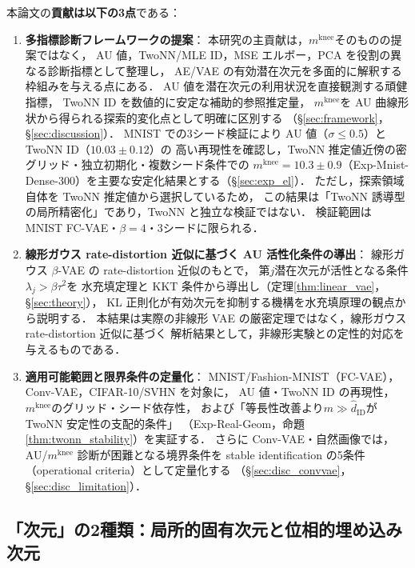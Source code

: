 \documentclass[11pt,a4paper]{jsarticle}
\newcommand{\mknee}{m^{\mathrm{knee}}}
\begin{document}
本論文の\textbf{貢献は以下の3点}である：
\begin{enumerate}
  \item \textbf{多指標診断フレームワークの提案}：
        本研究の主貢献は，$\mknee$そのものの提案ではなく，
        AU 値，TwoNN/MLE ID，MSE エルボー，PCA を役割の異なる診断指標として整理し，
        AE/VAE の有効潜在次元を多面的に解釈する枠組みを与える点にある．
        AU 値を潜在次元の利用状況を直接観測する頑健指標，
        TwoNN ID を数値的に安定な補助的参照推定量，
        $\mknee$を AU 曲線形状から得られる探索的変化点として明確に区別する
        （§\ref{sec:framework}，§\ref{sec:discussion}）．
        MNIST での3シード検証により AU 値（$\sigma \leq 0.5$）と TwoNN ID（$10.03 \pm 0.12$）の
        高い再現性を確認し，TwoNN 推定値近傍の密グリッド・独立初期化・複数シード条件での
        $\mknee = 10.3 \pm 0.9$（Exp-Mnist-Dense-300）を主要な安定化結果とする（§\ref{sec:exp_el}）．
        ただし，探索領域自体を TwoNN 推定値から選択しているため，
        この結果は「TwoNN 誘導型の局所精密化」であり，TwoNN と独立な検証ではない．
        検証範囲は MNIST FC-VAE・$\beta = 4$・3シードに限られる．
  \item \textbf{線形ガウス rate-distortion 近似に基づく AU 活性化条件の導出}：
        線形ガウス $\beta$-VAE の rate-distortion 近似のもとで，
        第$j$潜在次元が活性となる条件$\lambda_j > \beta\tau^2$を
        水充填定理と KKT 条件から導出し（定理\ref{thm:linear_vae}，§\ref{sec:theory}），
        KL 正則化が有効次元を抑制する機構を水充填原理の観点から説明する．
        本結果は実際の非線形 VAE の厳密定理ではなく，線形ガウス rate-distortion 近似に基づく
        解析結果として，非線形実験との定性的対応を与えるものである．
  \item \textbf{適用可能範囲と限界条件の定量化}：
        MNIST/Fashion-MNIST（FC-VAE），Conv-VAE，CIFAR-10/SVHN を対象に，
        AU 値・TwoNN ID の再現性，$\mknee$のグリッド・シード依存性，
        および「等長性改善より$m \gg \hat{d}_\mathrm{ID}$が TwoNN 安定性の支配的条件」
        （Exp-Real-Geom，命題\ref{thm:twonn_stability}）を実証する．
        さらに Conv-VAE・自然画像では，AU/$\mknee$ 診断が困難となる境界条件を
        stable identification の5条件（operational criteria）として定量化する
        （§\ref{sec:disc_convvae}，§\ref{sec:disc_limitation}）．
\end{enumerate}

\subsection{「次元」の2種類：局所的固有次元と位相的埋め込み次元}\label{sec:intro_dim}
\end{document}
